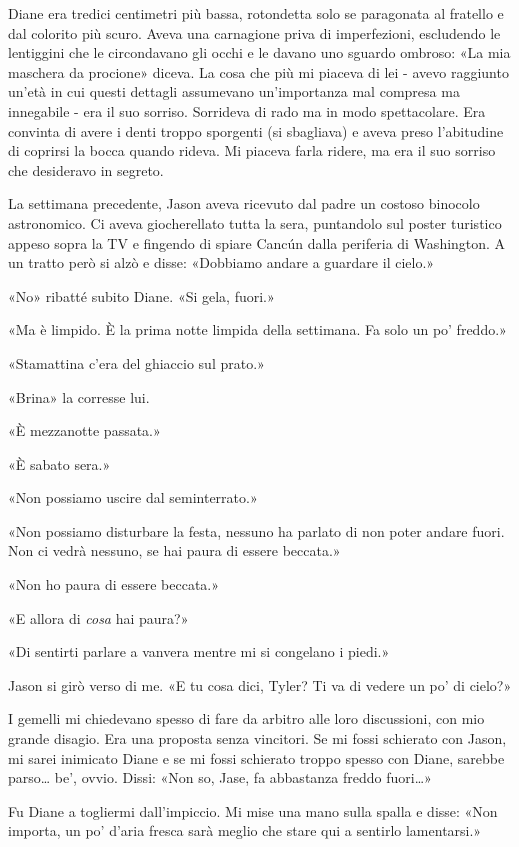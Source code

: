Diane era tredici centimetri più bassa, rotondetta solo se paragonata al
fratello e dal colorito più scuro. Aveva una carnagione priva di
imperfezioni, escludendo le lentiggini che le circondavano gli occhi e
le davano uno sguardo ombroso: «La mia maschera da procione» diceva. La
cosa che più mi piaceva di lei - avevo raggiunto un'età in cui questi
dettagli assumevano un'importanza mal compresa ma innegabile - era il
suo sorriso. Sorrideva di rado ma in modo spettacolare. Era convinta di
avere i denti troppo sporgenti (si sbagliava) e aveva preso l'abitudine
di coprirsi la bocca quando rideva. Mi piaceva farla ridere, ma era il
suo sorriso che desideravo in segreto.

La settimana precedente, Jason aveva ricevuto dal padre un costoso
binocolo astronomico. Ci aveva giocherellato tutta la sera, puntandolo
sul poster turistico appeso sopra la TV e fingendo di spiare Cancún
dalla periferia di Washington. A un tratto però si alzò e disse:
«Dobbiamo andare a guardare il cielo.»

«No» ribatté subito Diane. «Si gela, fuori.»

«Ma è limpido. È la prima notte limpida della settimana. Fa solo un po'
freddo.»

«Stamattina c'era del ghiaccio sul prato.»

«Brina» la corresse lui.

«È mezzanotte passata.»

«È sabato sera.»

«Non possiamo uscire dal seminterrato.»

«Non possiamo disturbare la festa, nessuno ha parlato di non poter
andare fuori. Non ci vedrà nessuno, se hai paura di essere beccata.»

«Non ho paura di essere beccata.»

«E allora di \emph{cosa} hai paura?»

«Di sentirti parlare a vanvera mentre mi si congelano i piedi.»

Jason si girò verso di me. «E tu cosa dici, Tyler? Ti va di vedere un
po' di cielo?»

I gemelli mi chiedevano spesso di fare da arbitro alle loro discussioni,
con mio grande disagio. Era una proposta senza vincitori. Se mi fossi
schierato con Jason, mi sarei inimicato Diane e se mi fossi schierato
troppo spesso con Diane, sarebbe parso\ldots{} be', ovvio. Dissi: «Non
so, Jase, fa abbastanza freddo fuori\ldots»

Fu Diane a togliermi dall'impiccio. Mi mise una mano sulla spalla e
disse: «Non importa, un po' d'aria fresca sarà meglio che stare qui a
sentirlo lamentarsi.»

